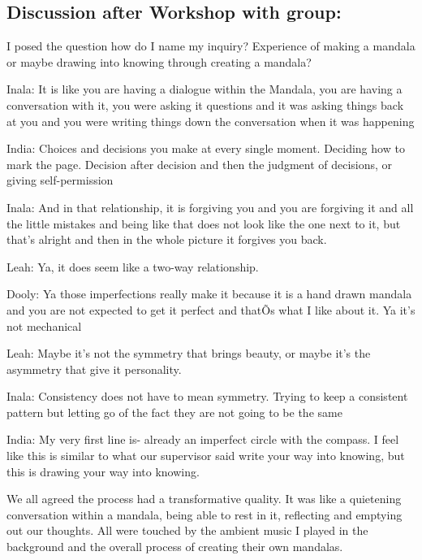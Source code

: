 \subsection{Discussion after Workshop with group:}

I posed the question how do I name my inquiry? Experience of making a mandala or maybe drawing into knowing through creating a mandala?

Inala: 
It is like you are having a dialogue within the Mandala, you are having a conversation with it, you were asking it questions and it was asking things back at you and you were writing things down the conversation when it was happening 

India:
Choices and decisions you make at every single moment. Deciding how to mark the page. Decision after decision and then the judgment of decisions, or giving self-permission

Inala:
And in that relationship, it is forgiving you and you are forgiving it and all the little mistakes and being like that does not look like the one next to it, but that's alright and then in the whole picture it forgives you back. 

Leah:
Ya, it does seem like a two-way relationship. 

Dooly:
Ya those imperfections really make it because it is a hand drawn mandala and you are not expected to get it perfect and thatÕs what I like about it. Ya it's not mechanical 

Leah:
Maybe it's not the symmetry that brings beauty, or maybe it's the asymmetry that give it personality. 

Inala:
Consistency does not have to mean symmetry. Trying to keep a consistent pattern but letting go of the fact they are not going to be the same

India:
My very first line is- already an imperfect circle with the compass.
I feel like this is similar to what our supervisor said write your way into knowing, but this is drawing your way into knowing.

We all agreed the process had a transformative quality. It was like a quietening conversation within a mandala, being able to rest in it, reflecting and emptying out our thoughts. All were touched by the ambient music I played in the background and the overall process of creating their own mandalas.














